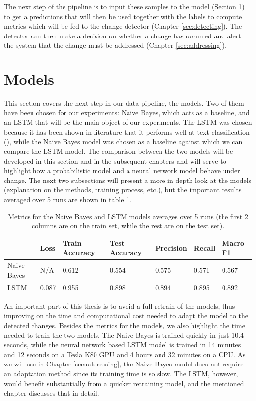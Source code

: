 \documentclass[12pt]{extreport}
\begin{document}
The next step of the pipeline is to input these samples to the model (Section \ref{sec:models}) to get a predictions that will then be used together with the labels to compute metrics which will be fed to the change detector (Chapter \ref{sec:detecting}). The detector can then make a decision on whether a change has occurred and alert the system that the change must be addressed (Chapter \ref{sec:addressing}).

\section{Models} \label{sec:models}

This section covers the next step in our data pipeline, the models. Two of them have been chosen for our experiments: Naive Bayes, which acts as a baseline, and an LSTM that will be the main object of our experiments. The LSTM was chosen because it has been shown in literature that it performs well at text classification (\cite{lstmrnnfundamentals}), while the Naive Bayes model was chosen as a baseline against which we can compare the LSTM model. The comparison between the two models will be developed in this section and in the subsequent chapters and will serve to highlight how a probabilistic model and a neural network model behave under change. The next two subsections will present a more in depth look at the models (explanation on the methods, training process, etc.), but the important results averaged over 5 runs are shown in table \ref{table:model-metrics}.

\begin{table}[ht!]
\centering
\begin{tabular}{|l|l|l|l|l|l|l|}
\hline
            & Loss & Train Accuracy & Test Accuracy & Precision & Recall & Macro F1 \\ \hline
Naive Bayes & N/A        & 0.612          & 0.554         & 0.575          & 0.571       & 0.567         \\ \hline
LSTM        & 0.087      & 0.955          & 0.898         & 0.894          & 0.895       & 0.892         \\ \hline
\end{tabular}
\caption{Metrics for the Naive Bayes and LSTM models averages over 5 runs (the first 2 columns are on the train set, while the rest are on the test set).}
\label{table:model-metrics}
\end{table}

An important part of this thesis is to avoid a full retrain of the models, thus improving on the time and computational cost needed to adapt the model to the detected changes. Besides the metrics for the models, we also highlight the time needed to train the two models. The Naive Bayes is trained quickly in just 10.4 seconds, while the neural network based LSTM model is trained in 14 minutes and 12 seconds on a Tesla K80 GPU and 4 hours and 32 minutes on a CPU. As we will see in Chapter \ref{sec:addressing}, the Naive Bayes model does not require an adaptation method since its training time is so slow. The LSTM, however, would benefit substantially from a quicker retraining model, and the mentioned chapter discusses that in detail.
\end{document}
